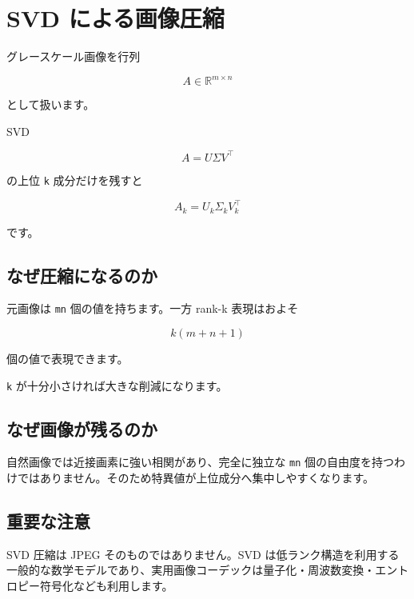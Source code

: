\documentclass[
  11pt,
  a4paper,
]{ltjsarticle}
\author{}
\date{}
\begin{document}
\hypertarget{svd-ux306bux3088ux308bux753bux50cfux5727ux7e2e}{%
\section{SVD
による画像圧縮}\label{svd-ux306bux3088ux308bux753bux50cfux5727ux7e2e}}

グレースケール画像を行列

\[
A\in\mathbb{R}^{m\times n}
\]

として扱います。

SVD

\[
A=U\Sigma V^\top
\]

の上位 \texttt{k} 成分だけを残すと

\[
A_k=U_k\Sigma_kV_k^\top
\]

です。

\hypertarget{ux306aux305cux5727ux7e2eux306bux306aux308bux306eux304b}{%
\subsection{なぜ圧縮になるのか}\label{ux306aux305cux5727ux7e2eux306bux306aux308bux306eux304b}}

元画像は \texttt{mn} 個の値を持ちます。一方 rank-k 表現はおよそ

\[
k(m+n+1)
\]

個の値で表現できます。

\texttt{k} が十分小さければ大きな削減になります。

\hypertarget{ux306aux305cux753bux50cfux304cux6b8bux308bux306eux304b}{%
\subsection{なぜ画像が残るのか}\label{ux306aux305cux753bux50cfux304cux6b8bux308bux306eux304b}}

自然画像では近接画素に強い相関があり、完全に独立な \texttt{mn}
個の自由度を持つわけではありません。そのため特異値が上位成分へ集中しやすくなります。

\hypertarget{ux91cdux8981ux306aux6ce8ux610f}{%
\subsection{重要な注意}\label{ux91cdux8981ux306aux6ce8ux610f}}

SVD 圧縮は JPEG そのものではありません。SVD
は低ランク構造を利用する一般的な数学モデルであり、実用画像コーデックは量子化・周波数変換・エントロピー符号化なども利用します。
\end{document}

